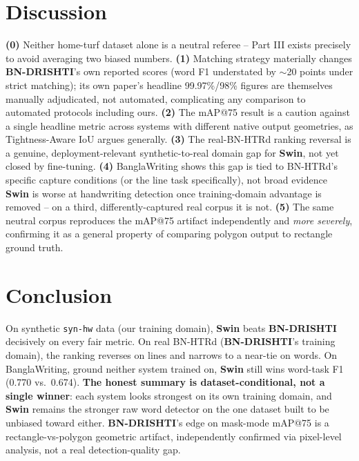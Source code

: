 \documentclass[10pt]{article}
\newcommand{\swin}{\textbf{Swin}}
\newcommand{\bnd}{\textbf{BN-DRISHTI}}
\begin{document}
\section{Discussion}

\textbf{(0)} Neither home-turf dataset alone is a neutral referee -- Part III exists
precisely to avoid averaging two biased numbers. \textbf{(1)} Matching strategy
materially changes \bnd's own reported scores (word F1 understated by $\sim$20 points
under strict matching); its own paper's headline 99.97\%/98\% figures are themselves
manually adjudicated, not automated, complicating any comparison to automated
protocols including ours. \textbf{(2)} The mAP@75 result is a caution against a single
headline metric across systems with different native output geometries, as
Tightness-Aware IoU \cite{liu2019tiou} argues generally. \textbf{(3)} The real-BN-HTRd
ranking reversal is a genuine, deployment-relevant synthetic-to-real domain gap for
\swin{}, not yet closed by fine-tuning. \textbf{(4)} BanglaWriting shows this gap is
tied to BN-HTRd's specific capture conditions (or the line task specifically), not
broad evidence \swin{} is worse at handwriting detection once training-domain
advantage is removed -- on a third, differently-captured real corpus it is not.
\textbf{(5)} The same neutral corpus reproduces the mAP@75 artifact independently and
\emph{more severely}, confirming it as a general property of comparing polygon output
to rectangle ground truth.

\section{Conclusion}

On synthetic \texttt{syn-hw} data (our training domain), \swin{} beats \bnd{}
decisively on every fair metric. On real BN-HTRd (\bnd's training domain), the
ranking reverses on lines and narrows to a near-tie on words. On BanglaWriting,
ground neither system trained on, \swin{} still wins word-task F1 (0.770 vs.\ 0.674).
\textbf{The honest summary is dataset-conditional, not a single winner}: each system
looks strongest on its own training domain, and \swin{} remains the stronger raw word
detector on the one dataset built to be unbiased toward either. \bnd's edge on
mask-mode mAP@75 is a rectangle-vs-polygon geometric artifact, independently
confirmed via pixel-level analysis, not a real detection-quality gap.
\end{document}
